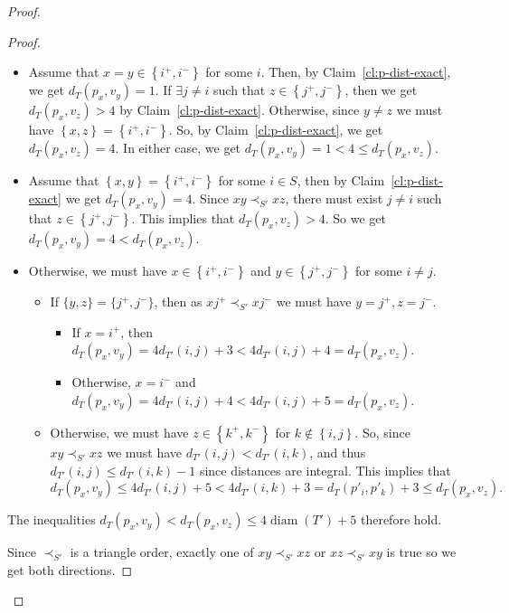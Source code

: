 \documentclass[11pt, letter]{article}
\theoremstyle{remark}
\DeclareMathOperator{\diam}{diam}
\newcommand{\set}[1]{\left\{#1\right\}}
\begin{document}
\begin{proof}
\begin{proof}
    \begin{itemize}
        \item Assume that $x=y\in \set{i^+,i^-}$ for some $i$. Then, by Claim~\ref{cl:p-dist-exact}, we get $d_T(p_x,v_y)=1$. If $\exists j\neq i$ such that $z\in \set{j^+,j^-}$, then we get $d_{T}(p_x,v_z)>4$ by Claim~\ref{cl:p-dist-exact}. Otherwise, since $y\neq z$ we must have $\set{x,z}=\set{i^+,i^-}$. So, by Claim~\ref{cl:p-dist-exact}, we get $d_{T}(p_x,v_z)=4$. In either case, we get $d_T(p_x,v_y)=1<4\leq d_T(p_x,v_z)$.
        \item Assume that $\set{x,y}=\set{i^+,i^-}$ for some $i\in S$, then by Claim~\ref{cl:p-dist-exact} we get $d_T(p_x,v_y)=4$. Since $xy\prec_{S'} xz$, there must exist $j\neq i$ such that $z\in \set{j^+,j^-}$. This implies that $d_T(p_x,v_z)>4$. So we get $d_{T}(p_x,v_y)=4<d_{T}(p_x,v_z)$.  
        \item Otherwise, we must have $x\in \set{i^+,i^-}$ and $y\in \set{j^+,j^-}$ for some $i\neq j$. 
        \begin{itemize}
            \item If $\{y, z\} = \{j^+, j^-\}$, then as $xj^+ \prec_{S'} xj^-$ we must have $y = j^+, z = j^-$.
            \begin{itemize}
                \item If $x=i^+$, then $d_T(p_x,v_y)=4d_{T'}(i,j)+3<4d_{T'}(i,j)+4=d_T(p_x,v_z)$.
                \item Otherwise, $x=i^-$ and $d_T(p_x,v_y)=4d_{T'}(i,j)+4<4d_{T'}(i,j)+5=d_T(p_x,v_z)$.
            \end{itemize}
            \item Otherwise, we must have $z\in \set{k^+,k^-}$ for $k\notin \set{i,j}$. So, since $xy\prec_{S'} xz$ we must have $d_{T'}(i,j)< d_{T'}(i,k)$, and thus $d_{T'}(i, j) \leq d_{T'}(i, k) - 1$ since distances are integral. 
            This implies that
            $$d_{T}(p_x,v_y)\leq 4d_{T'}(i,j)+5<4d_{T'}(i,k)+3 = d_T(p'_i, p'_k) + 3 \leq d_{T}(p_x,v_z).$$
        \end{itemize}
    \end{itemize}

    The inequalities $d_{T}(p_x,v_y)< d_{T}(p_x,v_z)\leq 4\diam(T')+5$ therefore hold.
    
    Since $\prec_{S'}$ is a triangle order, exactly one of $xy\prec_{S'} xz$ or $xz\prec_{S'} xy$ is true so we get both directions.  
\end{proof}






\end{proof}
\end{document}
